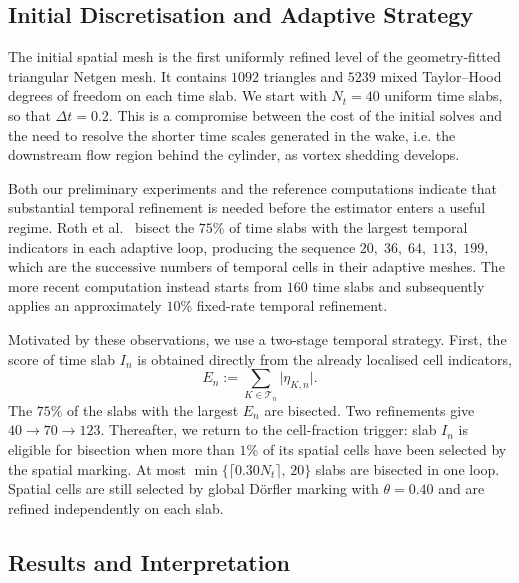 \subsection{Initial Discretisation and Adaptive Strategy}
\label{subsec:cylinder-adaptive-configuration}

The initial spatial mesh is the first uniformly refined level of the geometry-fitted triangular Netgen mesh. It contains \(1092\) triangles and \(5239\) mixed Taylor--Hood degrees of freedom on each time slab. We start with \(N_t=40\) uniform time slabs, so that \(\Delta t=0.2\). This is a compromise between the cost of the initial solves and the need to resolve the shorter time scales generated in the wake, i.e. the downstream flow region behind the cylinder, as vortex shedding develops.

Both our preliminary experiments and the reference computations indicate that substantial temporal refinement is needed before the estimator enters a useful regime. Roth et al.~\cite{non-flow} bisect the \(75\%\) of time slabs with the largest temporal indicators in each adaptive loop, producing the sequence
\(
  20,\;36,\;64,\;113,\;199,
\)
which are the successive numbers of temporal cells in their adaptive meshes.
The more recent computation \cite{recent-flow} instead starts from \(160\) time slabs and subsequently applies an approximately \(10\%\) fixed-rate temporal refinement.

Motivated by these observations, we use a two-stage temporal strategy. First, the score of time slab \(I_n\) is obtained directly from the already localised cell indicators,
\[
  E_n := \sum_{K\in\mathcal{T}_n}\lvert\eta_{K,n}\rvert.
\]
The \(75\%\) of the slabs with the largest \(E_n\) are bisected. Two refinements give
\(
  40\rightarrow70\rightarrow123.
\)
Thereafter, we return to the cell-fraction trigger: slab \(I_n\) is eligible for bisection when more than \(1\%\) of its spatial cells have been selected by the spatial marking. At most
\(
\min\bigl\{\lceil0.30N_t\rceil,\,20\bigr\}
\)
slabs are bisected in one loop. Spatial cells are still selected by global D\"orfler marking with \(\theta=0.40\) and are refined independently on each slab. 


\subsection{Results and Interpretation}
\label{subsec:cylinder-results}

